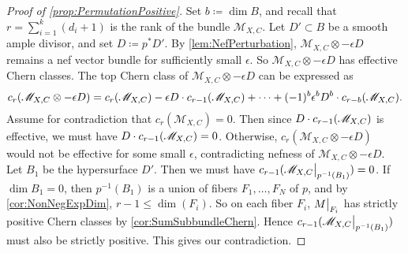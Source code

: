 \begin{proof}[Proof of \cref{prop:PermutationPositive}]
Set $b \coloneqq \dim B$, and recall that $r = \sum_{i=1}^k(d_i+1)$ is the rank of the bundle $\mathscr{M}_{X,C}$. Let $D' \subset B$ be a smooth ample divisor, and set $D \coloneqq p^*D'$. By \cref{lem:NefPerturbation}, $\mathscr{M}_{X,C} \otimes -\epsilon D$ remains a nef vector bundle for sufficiently small $\epsilon$. So $\mathscr{M}_{X,C} \otimes -\epsilon D$ has effective Chern classes. The top Chern class of $\mathscr{M}_{X,C} \otimes -\epsilon D$ can be expressed as
\[c_r(\mathscr{M}_{X,C} \otimes - \epsilon D) = c_r(\mathscr{M}_{X,C}) - \epsilon D \cdot c_{r-1}(\mathscr{M}_{X,C}) + \cdots + (-1)^b\epsilon^bD^b \cdot c_{r-b}(\mathscr{M}_{X,C}).\]
Assume for contradiction that $c_r(\mathscr{M}_{X,C}) = 0$. Then since $D \cdot c_{r-1}(\mathscr{M}_{X,C})$ is effective, we must have $D \cdot c_{r-1}(\mathscr{M}_{X,C}) = 0$. Otherwise, $c_r(\mathscr{M}_{X,C} \otimes -\epsilon D)$ would not be effective for some small $\epsilon$, contradicting nefness of $\mathscr{M}_{X,C} \otimes -\epsilon D$. Let $B_1$ be the hypersurface $D'$. Then we must have $c_{r-1}(\restr{\mathscr{M}_{X,C}}{p^{-1}(B_1)}) = 0$. If $\dim B_1 = 0$, then $p^{-1}(B_1)$ is a union of fibers $F_1,\dots,F_N$ of $p$, and by \cref{cor:NonNegExpDim}, $r-1 \leq \dim(F_i)$. So on each fiber $F_i$, $\restr{M}{F_i}$ has strictly positive Chern classes by \cref{cor:SumSubbundleChern}. Hence $c_{r-1}(\restr{\mathscr{M}_{X,C}}{p^{-1}(B_1)})$ must also be strictly positive. This gives our contradiction.


\end{proof}
